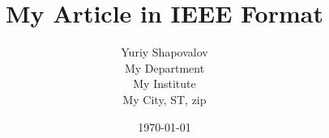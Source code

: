 
\pagestyle{empty}

\setlength{\textheight}{8.75in}
\setlength{\columnsep}{2.0pc}
\setlength{\textwidth}{6.8in}
\setlength{\footheight}{0.0in}
\setlength{\topmargin}{0.25in}
\setlength{\headheight}{0.0in}
\setlength{\headsep}{0.0in}
\setlength{\oddsidemargin}{-.19in}
\setlength{\parindent}{1pc}

\makeatletter
\def\@normalsize{\@setsize\normalsize{12pt}\xpt\@xpt
\abovedisplayskip 10pt plus2pt minus5pt\belowdisplayskip \abovedisplayskip
\abovedisplay\texttt{s}hortskip \z@ plus3pt\belowdisplayshortskip 6pt plus3pt
minus3pt\let\@listi\@listI} 

\def\subsize{\@setsize\subsize{12pt}\xipt\@xipt}

\def\section{\@startsection {section}{1}{\z@}{24pt plus 2pt minus 2pt}
{12pt plus 2pt minus 2pt}{\large\bf}}

\def\subsection{\@startsection {subsection}{2}{\z@}{12pt plus 2pt minus 2pt}
{12pt plus 2pt minus 2pt}{\subsize\bf}}
\makeatother



\date{\today}

\title{\Large\bf My Article in IEEE Format}

\author{Yuriy Shapovalov \\
  My Department \\
  My Institute \\
  My City, ST, zip}
 

